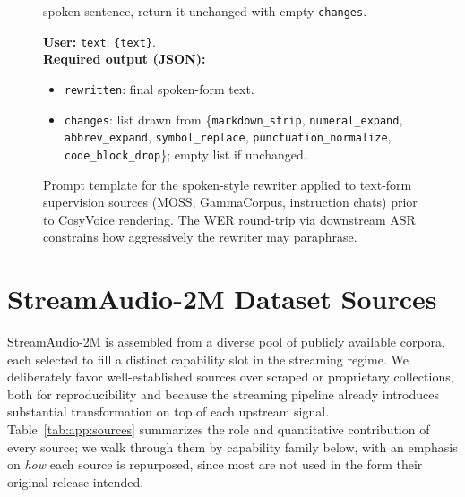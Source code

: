 \documentclass{article}
\begin{document}
\begin{figure}[H]
\begin{tcolorbox}
\begin{itemize}
        spoken sentence, return it unchanged with empty
        \texttt{changes}.
\end{itemize}
\textbf{User:} \texttt{text}: \verb|{text}|.\\[2pt]
\textbf{Required output (JSON):}
\begin{itemize}\setlength\itemsep{0pt}\setlength\topsep{0pt}
  \item \texttt{rewritten}: final spoken-form text.
  \item \texttt{changes}: list drawn from \{\texttt{markdown\_strip},
        \texttt{numeral\_expand}, \texttt{abbrev\_expand},
        \texttt{symbol\_replace}, \texttt{punctuation\_normalize},
        \texttt{code\_block\_drop}\}; empty list if unchanged.
\end{itemize}
\end{tcolorbox}
\caption{Prompt template for the spoken-style rewriter applied to
text-form supervision sources (MOSS, GammaCorpus, instruction chats)
prior to CosyVoice rendering. The WER round-trip via downstream ASR
constrains how aggressively the rewriter may paraphrase.}
\label{prompt:tts}
\end{figure}

\newpage
\section{StreamAudio-2M Dataset Sources}
\label{app:dataset}

StreamAudio-2M is assembled from a diverse pool of publicly available corpora, each
selected to fill a distinct capability slot in the streaming regime. We deliberately favor
well-established sources over scraped or proprietary collections, both for reproducibility
and because the streaming pipeline already introduces substantial transformation on top of
each upstream signal. Table~\ref{tab:app:sources} summarizes the role and quantitative
contribution of every source; we walk through them by capability family below, with an
emphasis on \emph{how} each source is repurposed, since most are not used in the form their
original release intended.
\end{document}
